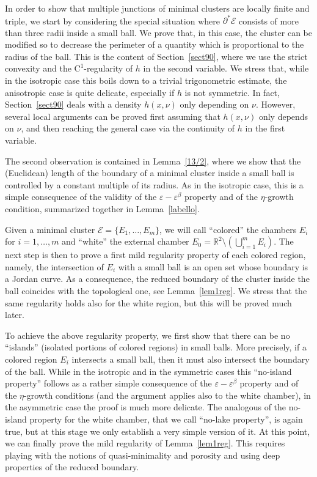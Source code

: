 \documentclass[JEP,XML,SOM,Unicode,NoFloatCountersInSection]{cedram}
\newcommand\R{\mathbb{R}}
\let\eps\varepsilon
\newcommand\E{\mathcal{E}}
\theoremstyle{plain}
\theoremstyle{definition}
\begin{document}
In order to show that multiple junctions of minimal clusters are locally finite and triple, we start by considering the special situation where $\partial^*\E$ consists of more than three radii inside a small ball. We prove that, in this case, the cluster can be modified so to decrease the perimeter of a quantity which is proportional to the radius of the ball. This is the content of Section~\ref{sect90}, where we use the strict convexity and the $\mathrm{C}^1$-regularity of $h$ in the second variable. We stress that, while in the isotropic case this boils down to a trivial trigonometric estimate, the anisotropic case is quite delicate, especially if $h$ is not symmetric. In fact, Section~\ref{sect90} deals with a density $h(x,\nu)$ only depending on $\nu$. However, several local arguments can be proved first assuming that $h(x,\nu)$ only depends on $\nu$, and then reaching the general case via the continuity of $h$ in the first variable.

The second observation is contained in Lemma~\ref{13/2}, where we show that the (Euclidean) length of the boundary of a minimal cluster inside a small ball is controlled by a constant multiple of its radius. As in the isotropic case, this is a simple consequence of the validity of the $\varepsilon-\varepsilon^\beta$ property and of the $\eta$-growth condition, summarized together in Lemma~\ref{labello}.

Given a minimal cluster $\mathcal E=\{E_1,\dots,E_m\}$, we will call ``colored'' the chambers $E_i$ for $i=1,\dots, m$ and ``white'' the external chamber $E_0=\R^2\setminus (\bigcup_{i=1}^mE_i)$. The next step is then to prove a first mild regularity property of each colored region, namely, the intersection of $E_i$ with a small ball is an open set whose boundary is a Jordan curve. As a consequence, the reduced boundary of the cluster inside the ball coincides with the topological one, see Lemma~\ref{lem1reg}. We stress that the same regularity holds also for the white region, but this will be proved much later.\enlargethispage{.5\baselineskip}%

To achieve the above regularity property, we first show that there can be no ``islands'' (\ie isolated portions of colored regions) in small balls. More precisely, if a colored region $E_i$ intersects a small ball, then it must also intersect the boundary of the ball. While in the isotropic and in the symmetric cases this ``no-island property'' follows as a rather simple consequence of the $\eps-\eps^\beta$ property and of the $\eta$-growth conditions (and the argument applies also to the white chamber), in the asymmetric case the proof is much more delicate. The analogous of the no-island property for the white chamber, that we call ``no-lake property'', is again true, but at this stage we only establish a very simple version of it. At this point, we can finally prove the mild regularity of Lemma~\ref{lem1reg}. This requires playing with the notions of quasi-minimality and porosity and using deep properties of the reduced boundary.
\end{document}
